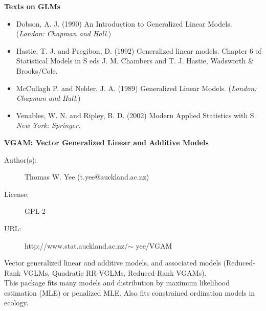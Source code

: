 \documentclass[MASTER.tex]{subfiles}
\begin{document}
\begin{frame}
	\large
	\textbf{Texts on GLMs}\\ \bigskip
\begin{itemize}
\item Dobson, A. J. (1990) An Introduction to Generalized Linear Models. (\textit{London: Chapman and Hall}.)
\bigskip
\item Hastie, T. J. and Pregibon, D. (1992) Generalized linear models. Chapter 6 of Statistical Models in S eds J. M. Chambers and T. J. Hastie, Wadsworth \& Brooks/Cole.
\bigskip
\item McCullagh P. and Nelder, J. A. (1989) Generalized Linear Models. (\textit{London: Chapman and Hall.})
\bigskip
\item Venables, W. N. and Ripley, B. D. (2002) Modern Applied Statistics with S. \textit{New York: Springer.}
\end{itemize}

\end{frame}
\begin{frame}
\textbf{VGAM: Vector Generalized Linear and Additive Models}
\begin{description}
\item[Author(s):] Thomas W. Yee (t.yee@auckland.ac.nz)
\item[License:] GPL-2
\item[URL:] http://www.stat.auckland.ac.nz/$\sim$ yee/VGAM
\end{description}
Vector generalized linear and additive models, and associated models (Reduced-Rank VGLMs, Quadratic RR-VGLMs, Reduced-Rank VGAMs). \\ \bigskip This package fits many models and distribution by maximum likelihood estimation (MLE) or penalized MLE. Also fits constrained ordination models in ecology.
\end{frame}
\end{document}
